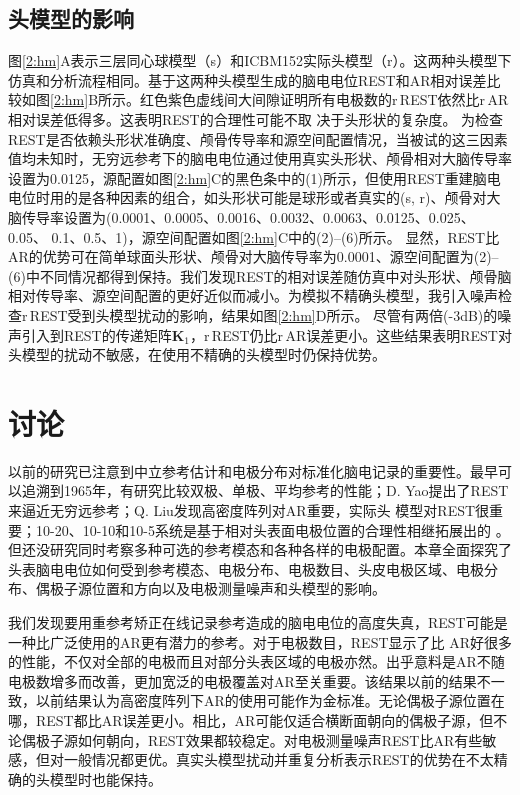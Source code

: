 \subsection{头模型的影响}
\label{2:hm-disturb}
图\ref{2:hm}A表示三层同心球模型（s）和ICBM152实际头模型（r）。这两种头模型下仿真和分析流程相同。基于这两种头模型生成的脑电电位REST和AR相对误差比较如图\ref{2:hm}B所示。红色紫色虚线间大间隙证明所有电极数的r\,REST依然比r\,AR相对误差低得多。这表明REST的合理性可能不取
决于头形状的复杂度。 为检查REST是否依赖头形状准确度、颅骨传导率和源空间配置情况，当被试的这三因素值均未知时，无穷远参考下的脑电电位通过使用真实头形状、颅骨相对大脑传导率设置为0.0125，源配置如图\ref{2:hm}C的黑色条中的(1)所示，但使用REST重建脑电电位时用的是各种因素的组合，如头形状可能是球形或者真实的(s, r)、颅骨对大脑传导率设置为(0.0001、0.0005、0.0016、0.0032、0.0063、0.0125、0.025、0.05、
0.1、0.5、1)，源空间配置如图\ref{2:hm}C中的(2)–(6)所示。 显然，REST比AR的优势可在简单球面头形状、颅骨对大脑传导率为0.0001、源空间配置为(2)–(6)中不同情况都得到保持。我们发现REST的相对误差随仿真中对头形状、颅骨脑相对传导率、源空间配置的更好近似而减小。为模拟不精确头模型，我引入噪声检查r\,REST受到头模型扰动的影响，结果如图\ref{2:hm}D所示。 尽管有两倍(-3dB)的噪声引入到REST的传递矩阵$\mathbf{K}_1$，r\,REST仍比r\,AR误差更小。这些结果表明REST对头模型的扰动不敏感，在使用不精确的头模型时仍保持优势。

\section{讨论}
以前的研究已注意到中立参考估计和电极分布对标准化脑电记录的重要性。最早可以追溯到1965年，有研究比较双极、单极、平均参考的性能；D. Yao提出了REST来逼近无穷远参考；Q. Liu发现高密度阵列对AR重要，实际头
模型对REST很重要；10-20、10-10和10-5系统是基于相对头表面电极位置的合理性相继拓展出的
。但还没研究同时考察多种可选的参考模态和各种各样的电极配置。本章全面探究了头表脑电电位如何受到参考模态、电极分布、电极数目、头皮电极区域、电极分布、偶极子源位置和方向以及电极测量噪声和头模型的影响。

我们发现要用重参考矫正在线记录参考造成的脑电电位的高度失真，REST可能是一种比广泛使用的AR更有潜力的参考。对于电极数目，REST显示了比
AR好很多的性能，不仅对全部的电极而且对部分头表区域的电极亦然。出乎意料是AR不随电极数增多而改善，更加宽泛的电极覆盖对AR至关重要。该结果以前的结果不一致，以前结果认为高密度阵列下AR的使用可能作为金标准。无论偶极子源位置在哪，REST都比AR误差更小。相比，AR可能仅适合横断面朝向的偶极子源，但不论偶极子源如何朝向，REST效果都较稳定。对电极测量噪声REST比AR有些敏感，但对一般情况都更优。真实头模型扰动并重复分析表示REST的优势在不太精确的头模型时也能保持。

